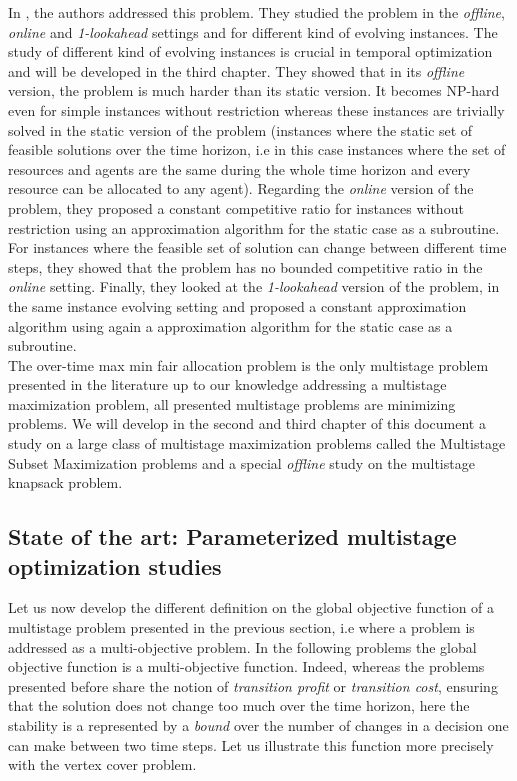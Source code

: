 \documentclass[a4paper]{book}
\begin{document}
In \cite{bampis2018fair}, the authors addressed this problem. They studied the problem in the \emph{offline}, \emph{online} and \emph{1-lookahead} settings and for different kind of evolving instances. The study of different kind of evolving instances is crucial in temporal optimization and will be developed in the third chapter. They showed that in its \emph{offline} version, the problem is much harder than its static version. It becomes NP-hard even for simple instances without restriction whereas these instances are trivially solved in the static version of the problem (instances where the static set of feasible solutions over the time horizon, i.e in this case instances where the set of resources and agents are the same during the whole time horizon and every resource can be allocated to any agent). Regarding the \emph{online} version of the problem, they proposed a constant competitive ratio for instances without restriction using an approximation algorithm for the static case as a subroutine. For instances where the feasible set of solution can change between different time steps, they showed that the problem has no bounded competitive ratio in the \emph{online} setting. Finally, they looked at the \emph{1-lookahead} version of the problem, in the same instance evolving setting and proposed a constant approximation algorithm using again a approximation algorithm for the static case as a subroutine. \\

The {\sc over-time max min fair allocation} problem is the only multistage problem presented in the literature up to our knowledge addressing a multistage maximization problem, all presented multistage problems are minimizing problems. We will develop in the second and third chapter of this document a study on a large class of multistage maximization problems called the {\sc Multistage Subset Maximization} problems and a special \textit{offline} study on the {\sc multistage knapsack problem}.


\subsection{State of the art: Parameterized multistage optimization studies}
Let us now develop the different definition on the global objective function of a multistage problem presented in the previous section, i.e where a problem is addressed as a multi-objective problem. In the following problems the global objective function is a multi-objective function. Indeed, whereas the problems presented before share the notion of \textit{transition profit} or \textit{transition cost}, ensuring that the solution does not change too much over the time horizon, here the stability is a represented by a \textit{bound} over the number of changes in a decision one can make between two time steps. Let us illustrate this function more precisely with the {\sc vertex cover} problem.
\end{document}
